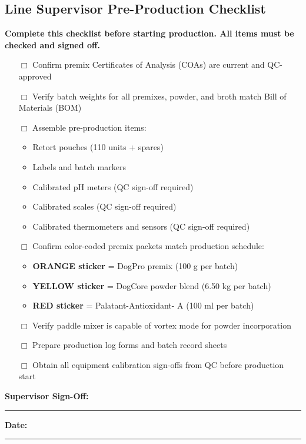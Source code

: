 \subsection*{Line Supervisor Pre-Production Checklist}

\textbf{Complete this checklist before starting production. All items must be checked and signed off.}

\begin{itemize}[leftmargin=1.5em]
\item[$\Box$] Confirm premix Certificates of Analysis (COAs) are current and QC-approved
\item[$\Box$] Verify batch weights for all premixes, powder, and broth match Bill of Materials (BOM)
\item[$\Box$] Assemble pre-production items:
  \begin{itemize}
  \item Retort pouches (110 units + spares)
  \item Labels and batch markers
  \item Calibrated pH meters (QC sign-off required)
  \item Calibrated scales (QC sign-off required)
  \item Calibrated thermometers and sensors (QC sign-off required)
  \end{itemize}
\item[$\Box$] Confirm color-coded premix packets match production schedule:
  \begin{itemize}
  \item \textbf{ORANGE sticker} = DogPro premix (100 g per batch)
  \item \textbf{YELLOW sticker} = DogCore powder blend (6.50 kg per batch)
  \item \textbf{RED sticker} = Palatant-Antioxidant- A (100 ml per batch)
  \end{itemize}
\item[$\Box$] Verify paddle mixer is capable of vortex mode for powder incorporation
\item[$\Box$] Prepare production log forms and batch record sheets
\item[$\Box$] Obtain all equipment calibration sign-offs from QC before production start
\end{itemize}

\vspace{1em}
\noindent\textbf{Supervisor Sign-Off:} \rule{5cm}{0.4pt} \hspace{1cm} \textbf{Date:} \rule{3cm}{0.4pt}

